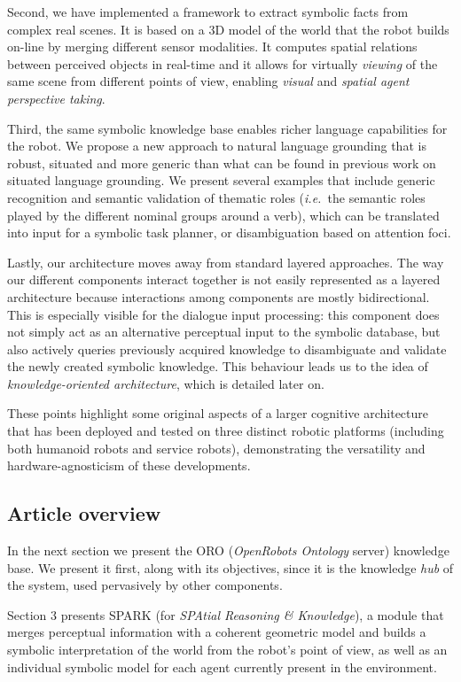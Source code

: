 \documentclass[twocolumn]{svjour3}
\newcommand{\ie}{{\textit{i.e.~}}}
\begin{document}
Second, we have implemented a framework to extract symbolic facts from complex
real scenes. It is based on a 3D model of the world that the robot builds
on-line by merging different sensor modalities. It computes spatial relations
between perceived objects in real-time and it allows for virtually \emph{viewing}
of the same scene from different points of view, enabling \emph{visual} and
\emph{spatial agent perspective taking}.

Third, the same symbolic knowledge base enables richer language capabilities
for the robot.  We propose a new approach to natural language grounding that is
robust, situated and more generic than what can be found in previous work
on situated language grounding. We present several examples that include
generic recognition and semantic validation of thematic roles (\ie the
semantic roles played by the different nominal groups around a verb), which
can be translated into input for a symbolic task planner, or disambiguation
based on attention foci.

Lastly, our architecture moves away from standard layered approaches. The way
our different components interact together is not easily represented as a
layered architecture because interactions among components are mostly
bidirectional.  This is especially visible for the dialogue input processing:
this component does not simply act as an alternative perceptual input to the
symbolic database, but also actively queries previously acquired knowledge to
disambiguate and validate the newly created symbolic knowledge. This behaviour
leads us to the idea of \emph{knowledge-oriented architecture}, which is
detailed later on.

These points highlight some original aspects of a larger cognitive architecture
that has been deployed and tested on three distinct robotic platforms
(including both humanoid robots and service robots), demonstrating the
versatility and hardware-agnosticism of these developments.

\subsection{Article overview}

In the next section we present the {\sc ORO}
(\emph{OpenRobots Ontology} server) knowledge base. We present it first, along with its objectives,
since it is the knowledge \textit{hub} of the system, used pervasively by other
components.

Section 3 presents {\sc SPARK} (for \emph{SPAtial Reasoning \& Knowledge}), a
module that merges perceptual information with a coherent geometric model and
builds a symbolic interpretation of the world from the robot's point of view,
as well as an individual symbolic model for each agent currently present in the
environment. 
\end{document}
